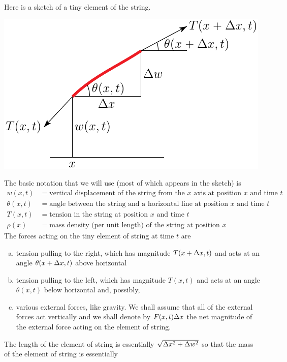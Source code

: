 Here is a sketch of a tiny element of the string.
\begin{center}
\begin{efig}
     \includegraphics{string_elmnt.pdf}
\end{efig}
\end{center}
The basic notation that we will use (most of which appears in the sketch) is
\begin{align*}
w(x,t) &= \text{vertical displacement of the string from the $x$ axis at 
position $x$ and time $t$} \\
\theta(x,t) &= \text{angle between the string and a horizontal line at 
position $x$ and time $t$} \\
T(x,t) &= \text{tension in the string at position $x$ and time $t$} \\
\rho(x) &= \text{mass density (per unit length) of the string at position $x$}
\end{align*}
The forces acting on the tiny element of string at time $t$ are 
\begin{enumerate}[(a)]
\item 
tension pulling to the right, which has magnitude $T(x+\Delta x,t)$ and
acts at an angle $\theta(x+\Delta x,t)$ above horizontal 
\item
tension pulling to the left, which has magnitude $T(x,t)$ and 
acts at an angle $\theta(x,t)$ below horizontal and, possibly, 
\item
various external forces, like
gravity. We shall assume that all of the external forces act vertically
and we shall denote by $F(x,t)\Delta x$ the net magnitude of the external force
acting on the element of string. 
\end{enumerate}
The length of the element of string is essentially $\sqrt{\Delta x^2+\Delta w^2}$
so that the mass of the element of string is essentially
